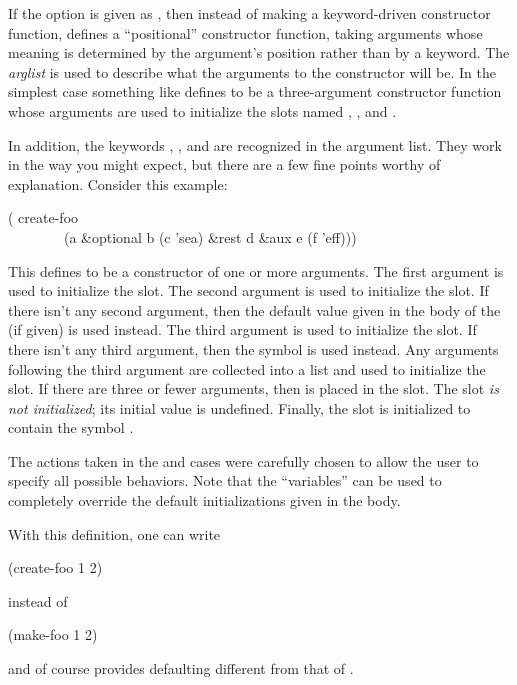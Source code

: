 If the  option is given as
,
then instead of making a keyword-driven constructor function,
 defines a ``positional'' constructor function,
taking arguments whose meaning is determined by the argument's position
rather than by a keyword.
The \emph{arglist} is used to describe what the arguments to the
constructor will be.  In the simplest case something like
 defines  to be
a three-argument constructor function whose arguments are used to initialize the
slots named , , and .

In addition, the keywords , , and  are
recognized in the argument list.  They work in the way you might expect,
but there are a few fine points worthy of explanation.
Consider this example:
\begin{lisp}
( create-foo \\
~~~~~~~~(a \&optional b (c 'sea) \&rest d \&aux e (f 'eff)))
\end{lisp}
This defines  to be a constructor of one or more arguments.
The first argument is used to initialize the  slot.  The second
argument is used to initialize the  slot.  If there isn't any
second argument, then the default value given in the body of the
 (if given) is used instead.  The third argument is used to
initialize the  slot.  If there isn't any third argument, then the
symbol  is used instead.  Any arguments following the third
argument are collected into a list and used to initialize the 
slot.  If there are three or fewer arguments, then {\false} is placed in
the  slot.  The  slot \emph{is not initialized}; its initial
value is undefined.  Finally, the  slot is initialized to contain
the symbol .

The actions taken in the  and  cases were carefully
chosen to allow the user to specify all possible behaviors.  Note that
the  ``variables'' can be used to completely override the default
initializations given in the body.

With this definition, one can write
\begin{lisp}
(create-foo 1 2)
\end{lisp}
instead of
\begin{lisp}
(make-foo  1  2)
\end{lisp}
and of course  provides defaulting different
from that of .

